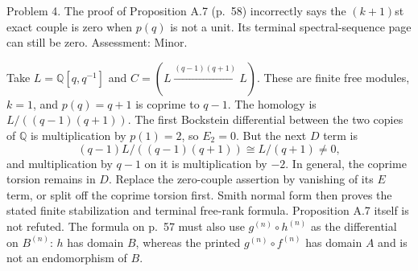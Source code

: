 \documentclass[10pt]{article}
\begin{document}
Problem 4.  The proof of Proposition A.7 (p. 58) incorrectly says the \((k+1)\)st exact couple is zero when \(p(q)\) is not a unit. Its terminal spectral-sequence page can still be zero. Assessment: Minor.\par
Take \(L=\mathbb Q[q,q^{-1}]\) and \(C=(L\xrightarrow{(q-1)(q+1)}L)\). These are finite free modules, \(k=1\), and \(p(q)=q+1\) is coprime to \(q-1\). The homology is \(L/((q-1)(q+1))\). The first Bockstein differential between the two copies of \(\mathbb Q\) is multiplication by \(p(1)=2\), so \(E_2=0\). But the next \(D\) term is \[(q-1)L/((q-1)(q+1))\cong L/(q+1)\ne0,\] and multiplication by \(q-1\) on it is multiplication by \(-2\). In general, the coprime torsion remains in \(D\). Replace the zero-couple assertion by vanishing of its \(E\) term, or split off the coprime torsion first. Smith normal form then proves the stated finite stabilization and terminal free-rank formula. Proposition A.7 itself is not refuted. The formula on p. 57 must also use \(g^{(n)}\circ h^{(n)}\) as the differential on \(B^{(n)}\): \(h\) has domain \(B\), whereas the printed \(g^{(n)}\circ f^{(n)}\) has domain \(A\) and is not an endomorphism of \(B\).\par
\end{document}
